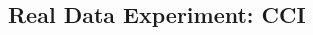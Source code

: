 \documentclass[10pt,journal,compsoc]{IEEEtran}
\begin{document}
\subsection{Real Data Experiment: CCI}









%
%
%
\begin{thebibliography}{1}


\end{thebibliography}

% 



\end{document}

